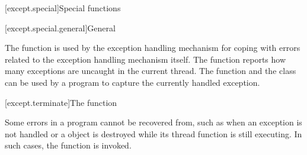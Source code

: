 [except.special]{Special functions}

[except.special.general]{General}

\pnum
The function 
is used by the exception
handling mechanism for coping with errors related to the exception handling
mechanism itself.
The function 
reports how many exceptions are uncaught in the current thread.
The function  and the class
 can be used by a program to
capture the currently handled exception.

[except.terminate]{The  function}

\pnum
{}%
Some errors in a program cannot be recovered from, such as when an exception
is not handled or a  object is destroyed while its thread
function is still executing. In such cases,
the function  is invoked.

